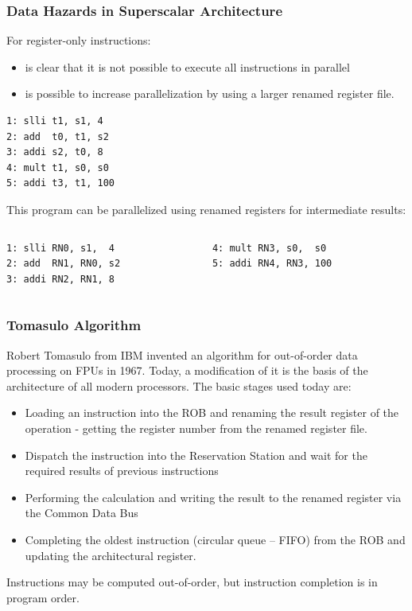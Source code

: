 \documentclass{beamer}
\begin{document}
\begin{frame}[fragile]
\frametitle{Data Hazards in Superscalar Architecture}

For register-only instructions:
\begin{itemize}
\item is clear that it is not possible to execute all instructions in parallel
\item is possible to increase parallelization by using a larger renamed register file.
\end{itemize}

\begin{verbatim}
1: slli t1, s1, 4
2: add  t0, t1, s2
3: addi s2, t0, 8
4: mult t1, s0, s0
5: addi t3, t1, 100
\end{verbatim}

This program can be parallelized using renamed registers for intermediate results:

\begin{columns}[T]
\begin{column}{0.40\textwidth}
\begin{verbatim}
1: slli RN0, s1,  4
2: add  RN1, RN0, s2
3: addi RN2, RN1, 8
\end{verbatim}
\end{column}
\begin{column}{0.40\textwidth}
\begin{verbatim}
4: mult RN3, s0,  s0
5: addi RN4, RN3, 100
\end{verbatim}
\end{column}
\end{columns}
\end{frame}


\begin{frame}
\frametitle{Tomasulo Algorithm}

Robert Tomasulo from IBM invented an algorithm for out-of-order data processing on FPUs in 1967.
Today, a modification of it is the basis of the architecture of all modern processors.
The basic stages used today are:
\begin{itemize}
\item Loading an instruction into the ROB and renaming the result register of the operation - getting the register number from the renamed register file.
\item Dispatch the instruction into the Reservation Station and wait for the required results of previous instructions
\item Performing the calculation and writing the result to the renamed register via the Common Data Bus
\item Completing the oldest instruction (circular queue -- FIFO) from the ROB and updating the architectural register.
\end{itemize}
Instructions may be computed out-of-order, but instruction completion is in program order.
\end{frame}
\end{document}
